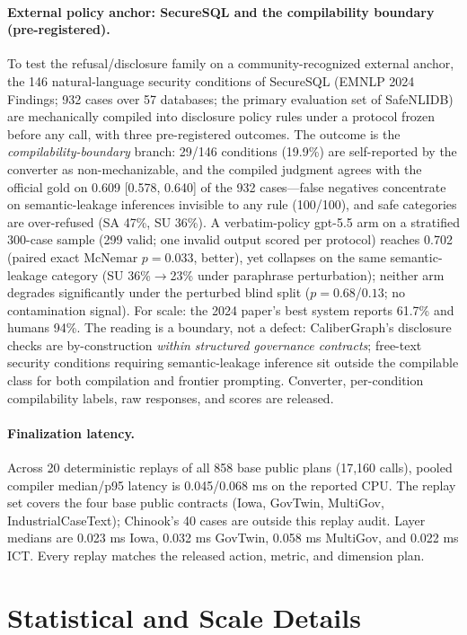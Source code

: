\documentclass[letterpaper]{article}
\begin{document}
\paragraph{External policy anchor: SecureSQL and the compilability boundary (pre-registered).}
To test the refusal/disclosure family on a community-recognized external anchor, the 146 natural-language security conditions of SecureSQL (EMNLP 2024 Findings; 932 cases over 57 databases; the primary evaluation set of SafeNLIDB) are mechanically compiled into disclosure policy rules under a protocol frozen before any call, with three pre-registered outcomes. The outcome is the \emph{compilability-boundary} branch: 29/146 conditions (19.9\%) are self-reported by the converter as non-mechanizable, and the compiled judgment agrees with the official gold on 0.609 [0.578, 0.640] of the 932 cases---false negatives concentrate on semantic-leakage inferences invisible to any rule (100/100), and safe categories are over-refused (SA 47\%, SU 36\%). A verbatim-policy gpt-5.5 arm on a stratified 300-case sample (299 valid; one invalid output scored per protocol) reaches 0.702 (paired exact McNemar $p{=}0.033$, better), yet collapses on the same semantic-leakage category (SU 36\%$\to$23\% under paraphrase perturbation); neither arm degrades significantly under the perturbed blind split ($p{=}0.68$/$0.13$; no contamination signal). For scale: the 2024 paper's best system reports 61.7\% and humans 94\%. The reading is a boundary, not a defect: CaliberGraph's disclosure checks are by-construction \emph{within structured governance contracts}; free-text security conditions requiring semantic-leakage inference sit outside the compilable class for both compilation and frontier prompting. Converter, per-condition compilability labels, raw responses, and scores are released.

\paragraph{Finalization latency.}
Across 20 deterministic replays of all 858 base public plans (17,160 calls), pooled compiler median/p95 latency is 0.045/0.068 ms on the reported CPU. The replay set covers the four base public contracts (Iowa, GovTwin, MultiGov, IndustrialCaseText); Chinook's 40 cases are outside this replay audit. Layer medians are 0.023 ms Iowa, 0.032 ms GovTwin, 0.058 ms MultiGov, and 0.022 ms ICT. Every replay matches the released action, metric, and dimension plan.

\onecolumn
\section{Statistical and Scale Details}
\end{document}
